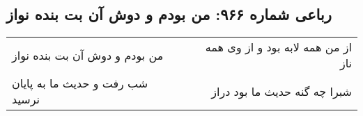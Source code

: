 \begin{center}
\section*{رباعی شماره ۹۶۶: من بودم و دوش آن بت بنده نواز}
\label{sec:0966}
\begin{longtable}{l p{0.5cm} r}
من بودم و دوش آن بت بنده نواز
&&
از من همه لابه بود و از وی همه ناز
\\
شب رفت و حدیث ما به پایان نرسید
&&
شبرا چه گنه حدیث ما بود دراز
\\
\end{longtable}
\end{center}
